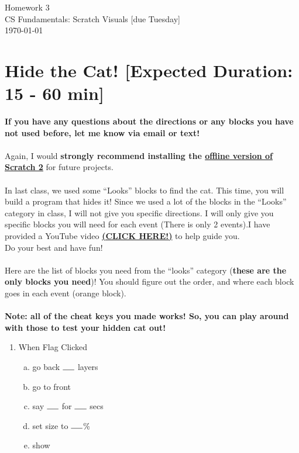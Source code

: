 \documentclass[11pt]{article}
\newcommand{\myhwname}{Homework 3}
\newcommand{\mysection}{CS Fundamentals: Scratch Visuals [due Tuesday]}
\begin{document}
\begin{center}
    {\Large \myhwname} \\
    \mysection \\
    \today
\end{center}

\section{Hide the Cat! [Expected Duration: 15 - 60 min]}
\textbf{If you have any questions about the directions or any blocks you have not used before, let me know via email or text!}\\
\noindent\makebox[\linewidth]{\rule{\paperwidth}{0.4pt}}\\
Again, I would \textbf{strongly recommend installing the \href{https://scratch.mit.edu/scratch2download/}{offline version of Scratch 2}} for future projects.\\\\
In last class, we used some ``Looks'' blocks to find the cat. This time, you will build a program that hides it! Since we used a lot of the blocks in the ``Looks'' category in class, I will not give you specific directions. I will only give you specific blocks you will need for each event (There is only 2 events).I have provided a YouTube video \textbf{\href{https://youtu.be/Ctk1z6EHQrg}{(CLICK HERE!)}} to help guide you.\\
Do your best and have fun!\\
\noindent\makebox[\linewidth]{\rule{\paperwidth}{0.4pt}}\\
Here are the list of blocks you need from the ``looks'' category (\textbf{these are the only blocks you need})! You should figure out the order, and where each block goes in each event (orange block).\\\\
\textbf{Note: all of the cheat keys you made works! So, you can play around with those to test your hidden cat out!}\\
\noindent\makebox[\linewidth]{\rule{\paperwidth}{0.4pt}}
\begin{enumerate}
\item When Flag Clicked
\begin{enumerate}[a.]
\item go back $\rule{0.5cm}{0.15mm}$ layers
\item go to front
\item say $\rule{0.5cm}{0.15mm}$ for $\rule{0.5cm}{0.15mm}$ secs
\item set size to $\rule{0.5cm}{0.15mm}$\%
\item show
\end{enumerate}
\end{enumerate}
\end{document}
